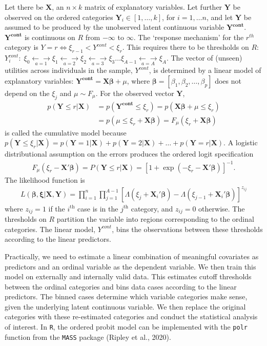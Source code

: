 \documentclass[12pt,econ]{sources/authesis}
\begin{document}
Let there be \(\bm{X}\), an \(n \times k\) matrix of explanatory variables. Let further \(\bm{Y}\) be observed on the ordered categories \(\bm{Y}_i \in [1,\ldots,k]\), for \(i=1,\ldots n\), and let \(\bm{Y}\) be assumed to be produced by the unobserved latent continuous variable \(\bm{Y^{cont}}\). \(\bm{Y^{cont}}\) is continuous on \(R\) from \(-\infty\) to \(\infty\). The `response mechanism' for the \(r^{th}\) category is \(Y=r \Longleftrightarrow \xi_{r-1} < Y^{cont} < \xi_r\). This requires there to be thresholds on \(R\):
\(Y^{cont}_i: \; \xi_0 \underset{a=1}{\longleftarrow\!\longrightarrow} \xi_1 \underset{a=2}{\longleftarrow\!\longrightarrow} \xi_2 \underset{a=3}{\longleftarrow\!\longrightarrow} \xi_3\ldots \xi_{A-1} \underset{a=A}{\longleftarrow\!\longrightarrow} \xi_A\). The vector of (unseen) utilities across individuals in the sample, \(Y^{cont}\), is determined by a linear model of explanatory variables: \(\bm{Y^{cont}} = \bm{X} \bm{\beta} + \mu\), where \(\bm{\beta} =[\beta_1,\beta_2,\ldots,\beta_p]\) does not depend on the \(\xi_j\) and \(\mu \sim F_{\mu}\). For the observed vector \(\bm{Y}\),
\begin{align}
p(\bm{Y} \leq r|\bm{X}) &= p(\bm{Y^{cont}} \leq \xi_r) = p(\bm{X}\bm{\beta} + \mu \leq \xi_r) \nonumber\\
&= p(\mu \leq \xi_r+\bm{X}\bm{\beta}) = F_{\mu}(\xi_r + \bm{X}\bm{\beta})
\end{align}
is called the cumulative model because \(p(\bm{Y} \leq \xi_r|\bm{X}) = p(\bm{Y}=1|\bm{X}) + p(\bm{Y}=2|\bm{X}) + \ldots + p(\bm{Y}=r|\bm{X})\). A logistic distributional assumption on the errors produces the ordered logit specification
\begin{align}
F_{\mu}(\xi_r - \bm{X}'\bm{\beta}) = P(\bm{Y} \leq r|\bm{X}) = [1+\exp(-\xi_r-\bm{X}'\bm{\beta})]^{-1}. 
\end{align}
The likelihood function is
\begin{align}
L(\bm{\beta},\bm{\xi}|\bm{X},\bm{Y}) = \prod_{i=1}^{n}\prod_{j=1}^{A-1}\left[\Lambda(\xi_j + \bm{X}_i'\bm{\beta}) - \Lambda(\xi_{j-1} + \bm{X}_i'\bm{\beta}) \right]^{z_{ij}}
\end{align}
where \(z_{ij}=1\) if the \(i^\text{th}\) case is in the \(j^\text{th}\) category, and \(z_{ij}=0\) otherwise. The thresholds on \(R\) partition the variable into regions corresponding to the ordinal categories. The linear model, \(Y^{cont}\), bins the observations between these thresholds according to the linear predictors.

Practically, we need to estimate a linear combination of meaningful covariates as predictors and an ordinal variable as the dependent variable. We then train this model on externally and internally valid data. This estimates cutoff thresholds between the ordinal categories and bins data cases according to the linear predictors. The binned cases determine which variable categories make sense, given the underlying latent continuous variable. We then replace the original categories with these re-estimated categories and conduct the statistical analysis of interest. In \texttt{R}, the ordered probit model can be implemented with the \texttt{polr} function from the \texttt{MASS} package (Ripley et al., 2020).
\end{document}
